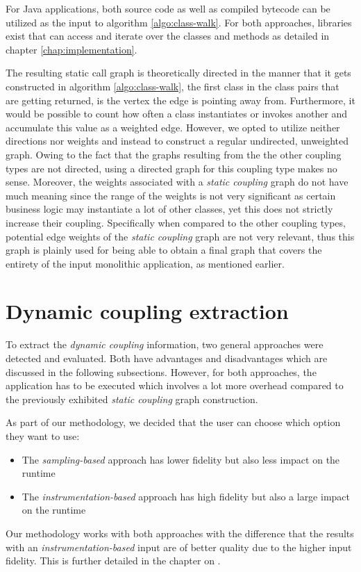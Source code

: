 \documentclass[12pt,a4paper]{report}
\begin{document}
For Java applications, both source code as well as compiled bytecode can
be utilized as the input to algorithm \ref{algo:class-walk}.
For both approaches, libraries exist that can access and iterate over
the classes and methods as detailed in chapter \ref{chap:implementation}.

The resulting static call graph is theoretically directed in the manner that it
gets constructed in algorithm \ref{algo:class-walk}, the first class in the class
pairs that are getting returned, is the vertex the edge is pointing away from.
Furthermore, it would be possible to count how often a class instantiates or
invokes another and accumulate this value as a weighted edge.
However, we opted to utilize neither directions nor weights
and instead to construct a regular undirected, unweighted graph.
Owing to the fact that the graphs resulting from the the other coupling types
are not directed, using a directed graph for this coupling type makes no sense.
Moreover, the weights associated with a \textit{static coupling} graph
do not have much meaning since the range of the weights is not very significant
as certain business logic may instantiate a lot of other classes,
yet this does not strictly increase their coupling.
Specifically when compared to the other coupling types, potential edge weights
of the \textit{static coupling} graph are not very relevant, thus this graph
is plainly used for being able to obtain a final graph that covers the
entirety of the input monolithic application, as mentioned earlier.



\section{Dynamic coupling extraction} \label{sect:dynamic-coupling-extraction}

To extract the \textit{dynamic coupling} information, two general approaches
were detected and evaluated. Both have advantages and disadvantages which
are discussed in the following subsections. However, for both approaches,
the application has to be executed which involves a lot more overhead compared
to the previously exhibited \textit{static coupling} graph construction.

As part of our methodology, we decided that the user can choose which option
they want to use:
\begin{itemize}[noitemsep]
  \item The \textit{sampling\hyp based} approach has lower fidelity but
        also less impact on the runtime
  \item The \textit{instrumentation\hyp based} approach has high fidelity but
        also a large impact on the runtime
\end{itemize}
Our methodology works with both approaches with the difference that the results
with an \textit{instrumentation\hyp based} input are of better quality due to the
higher input fidelity. This is further detailed in the chapter on
\textit{}.
\end{document}
